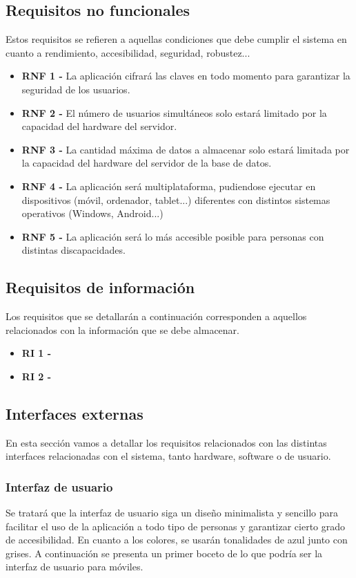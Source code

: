 \subsection{Requisitos no funcionales}
Estos requisitos se refieren a aquellas condiciones que debe cumplir el sistema en cuanto a rendimiento, accesibilidad, seguridad, robustez...
\begin{itemize}
    \item \textbf{RNF 1 - } La aplicación cifrará las claves en todo momento para garantizar la seguridad de los usuarios.
    \item \textbf{RNF 2 - } El número de usuarios simultáneos solo estará limitado por la capacidad del hardware del servidor.
    \item \textbf{RNF 3 - } La cantidad máxima de datos a almacenar solo estará limitada por la capacidad del hardware del servidor de la base de datos.
    \item \textbf{RNF 4 - } La aplicación será multiplataforma, pudiendose ejecutar en dispositivos (móvil, ordenador, tablet...) diferentes con distintos sistemas operativos (Windows, Android...)
    \item \textbf{RNF 5 - } La aplicación será lo más accesible posible para personas con distintas discapacidades. 
\end{itemize}
\subsection{Requisitos de información}
Los requisitos que se detallarán a continuación corresponden a aquellos relacionados con la información que se debe almacenar.
\begin {itemize}
    \item \textbf{RI 1 - }
    \item \textbf{RI 2 - }
\end {itemize}

\subsection{Interfaces externas}
En esta sección vamos a detallar los requisitos relacionados con las distintas interfaces relacionadas con el sistema, 
tanto hardware, software o de usuario.

\subsubsection{Interfaz de usuario}
Se tratará que la interfaz de usuario siga un diseño minimalista y sencillo para facilitar el uso de la aplicación a todo tipo de personas y 
garantizar cierto grado de accesibilidad. En cuanto a los colores, se usarán tonalidades de azul junto con grises.
A continuación se presenta un primer boceto de lo que podría ser la interfaz de usuario para móviles.


